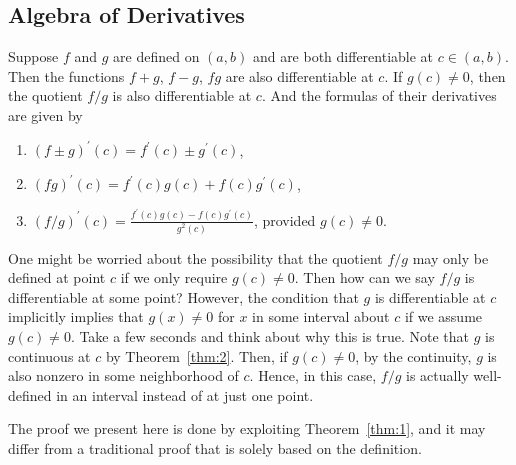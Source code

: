\documentclass[thmcnt=section, 12pt]{my-elegantbook}
\begin{document}

\subsection{Algebra of Derivatives}


\begin{theorem}
    Suppose $f$ and $g$ are defined on $(a, b)$ and are both differentiable at $c \in (a, b)$. Then the functions $f + g$, $f - g$, $fg$ are also differentiable at $c$. If $g(c) \neq 0$, then the quotient $f / g$ is also differentiable at $c$. And the formulas of their derivatives are given by
    \begin{enumerate}
        \item $(f \pm g)^\prime(c) = f^\prime(c) \pm g^\prime(c)$,
        \item $(f g)^\prime(c) = f^\prime(c) g(c) + f(c) g^\prime(c)$,
        \item $(f / g)^\prime(c) = \frac{f^\prime(c) g(c) - f(c) g^\prime(c)}{ g^2(c) }$, provided $g(c) \neq 0$.
    \end{enumerate}
\end{theorem}

\begin{remark}
    One might be worried about the possibility that the quotient $f / g$ may only be defined at point $c$ if we only require $g(c) \neq 0$. Then how can we say $f / g$ is differentiable at some point? However, the condition that $g$ is differentiable at $c$ implicitly implies that $g(x) \neq 0$ for $x$ in some interval about $c$ if we assume $g(c) \neq 0$. Take a few seconds and think about why this is true. Note that $g$ is continuous at $c$ by Theorem~\ref{thm:2}. Then, if $g(c) \neq 0$, by the continuity, $g$ is also nonzero in some neighborhood of $c$. Hence, in this case, $f / g$ is actually well-defined in an interval instead of at just one point.
\end{remark}

The proof we present here is done by exploiting Theorem~\ref{thm:1}, and it may differ from a traditional proof that is solely based on the definition.
\end{document}
